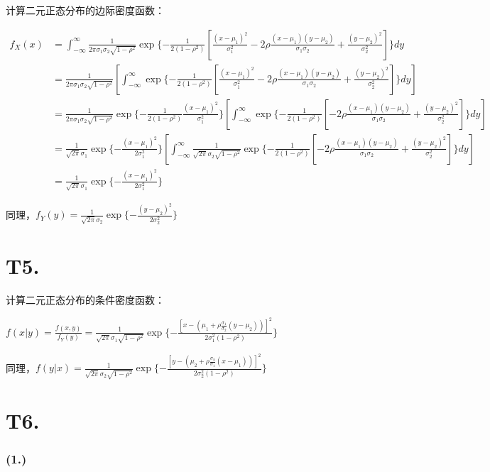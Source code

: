 \documentclass{article}
\newcommand\f[2]{\frac{#1}{#2}}
\begin{document}
计算二元正态分布的边际密度函数：

\begin{equation}
    \begin{aligned}
        f_X(x)
        & = \int_{-\infty}^{\infty}\f{1}{2\pi\sigma_1\sigma_2\sqrt{1-\rho^2}}\exp\{-\f{1}{2(1-\rho^2)}[\f{(x-\mu_1)^2}{\sigma_1^2}-2\rho\f{(x-\mu_1)(y-\mu_2)}{\sigma_1\sigma_2}+\f{(y-\mu_2)^2}{\sigma_2^2}]\}dy\\
        & = \f{1}{2\pi\sigma_1\sigma_2\sqrt{1-\rho^2}}[\int_{-\infty}^{\infty}\exp\{-\f{1}{2(1-\rho^2)}[\f{(x-\mu_1)^2}{\sigma_1^2}-2\rho\f{(x-\mu_1)(y-\mu_2)}{\sigma_1\sigma_2}+\f{(y-\mu_2)^2}{\sigma_2^2}]\}dy]\\
        & = \f{1}{2\pi\sigma_1\sigma_2\sqrt{1-\rho^2}}\exp\{-\f{1}{2(1-\rho^2)}\f{(x-\mu_1)^2}{\sigma_1^2}\}[\int_{-\infty}^{\infty}\exp\{-\f{1}{2(1-\rho^2)}[-2\rho\f{(x-\mu_1)(y-\mu_2)}{\sigma_1\sigma_2}+\f{(y-\mu_2)^2}{\sigma_2^2}]\}dy]\\
        & = \f{1}{\sqrt{2\pi}\sigma_1}\exp\{-\f{(x-\mu_1)^2}{2\sigma_1^2}\}[\int_{-\infty}^{\infty}\f{1}{\sqrt{2\pi}\sigma_2\sqrt{1-\rho^2}}\exp\{-\f{1}{2(1-\rho^2)}[-2\rho\f{(x-\mu_1)(y-\mu_2)}{\sigma_1\sigma_2}+\f{(y-\mu_2)^2}{\sigma_2^2}]\}dy]\\
        & = \f{1}{\sqrt{2\pi}\sigma_1}\exp\{-\f{(x-\mu_1)^2}{2\sigma_1^2}\}
    \end{aligned}
\end{equation}

同理，$f_Y(y)=\f{1}{\sqrt{2\pi}\sigma_2}\exp\{-\f{(y-\mu_2)^2}{2\sigma_2^2}\}$

\section*{T5. }

计算二元正态分布的条件密度函数：

$f(x|y) = \f{f(x,y)}{f_Y(y)} = \f{1}{\sqrt{2\pi}\sigma_1\sqrt{1-\rho^2}}\exp\{-\f{[x-(\mu_1+\rho\f{\sigma_1}{\sigma_2}(y-\mu_2))]^2}{2\sigma_1^2(1-\rho^2)}\}$

同理，$f(y|x)=\f{1}{\sqrt{2\pi}\sigma_2\sqrt{1-\rho^2}}\exp\{-\f{[y-(\mu_2+\rho\f{\sigma_2}{\sigma_1}(x-\mu_1))]^2}{2\sigma_2^2(1-\rho^2)}\}$

\section*{T6. }

\subsubsection*{(1.)}
\end{document}
